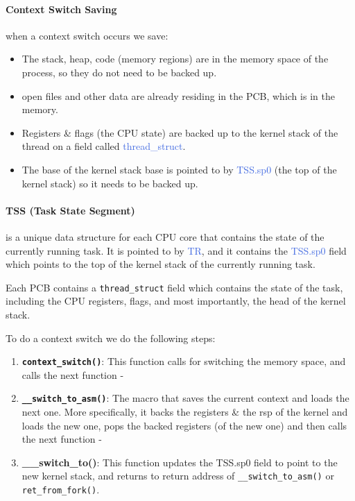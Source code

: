 \documentclass[openany,12pt]{book}
\newcommand{\code}[1]{\texttt{#1}}
\newcommand{\blue}[1]{\textcolor{RoyalBlue}{#1}}
\begin{document}
\paragraph{Context Switch Saving} when a context switch occurs we save:
\begin{itemize}
  \item The stack, heap, code (memory regions) are in the memory space of the process, so they do not need to be backed up.

  \item open files and other data are already residing in the PCB, which is in the memory.

  \item Registers \& flags (the CPU state) are backed up to the kernel stack of the thread on a field called \blue{thread\_struct}.

  \item The base of the kernel stack base is pointed to by \blue{TSS.sp0} (the top of the kernel stack) so it needs to be backed up.
\end{itemize}

\paragraph{TSS (Task State Segment)} is a unique data structure for each CPU core that contains the state of the currently running task. It is pointed to by \blue{TR}, and it contains the \blue{TSS.sp0} field which points to the top of the kernel stack of the currently running task. 

Each PCB contains a \code{thread\_struct} field which contains the state of the task, including the CPU registers, flags, and most importantly, the head of the kernel stack.


To do a context switch we do the following steps:
\begin{enumerate}
  \item \textbf{\code{context\_switch()}}: This function calls for switching the memory space, and calls the next function -

  \item \textbf{\code{\_\_switch\_to\_asm()}}: The macro that saves the current context and loads the next one. More specifically, it backs the registers \& the rsp of the kernel and loads the new one, pops the backed registers (of the new one) and then calls the next function -

  \item \textbf{\_\_switch\_to()}: This function updates the TSS.sp0 field to point to the new kernel stack, and returns to return address of \code{\_\_switch\_to\_asm()} or \code{ret\_from\_fork()}.
\end{enumerate}
\end{document}
